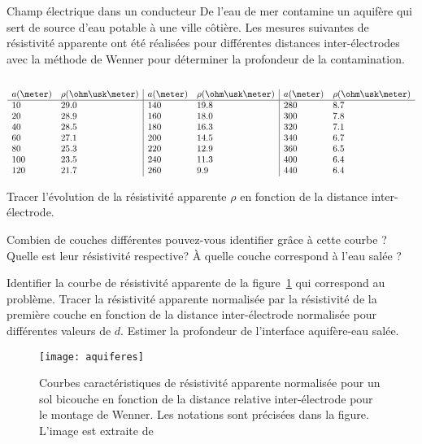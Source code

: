 \begin{td}{Champ électrique dans un conducteur}
	De l'eau de mer contamine un aquifère qui sert de source d'eau potable à 
	une ville côtière. Les mesures suivantes de résistivité apparente ont été
	réalisées pour différentes distances inter-électrodes avec la méthode de 
	Wenner pour déterminer la profondeur de la contamination.
	
	\begin{equation*}
	\begin{array}{l l| l l| l l} \\
		a (\meter) & \rho (\ohm \usk \meter) & a (\meter) & 
		\rho (\ohm \usk \meter) &a(\meter) & \rho (\ohm \usk \meter) \\ \hline
		10	& 29.0	& 140	& 19.8	& 280	& 8.7 \\
		20	& 28.9	& 160	& 18.0	& 300	& 7.8 \\
		40 	& 28.5	& 180	& 16.3	& 320	& 7.1 \\
		60	& 27.1  & 200	& 14.5	& 340	& 6.7 \\
		80	& 25.3	& 220	& 12.9	& 360	& 6.5 \\
		100	& 23.5	& 240	& 11.3	& 400	& 6.4 \\
		120	& 21.7	& 260	& 9.9	& 440	& 6.4 \\
	\end{array}
	\end{equation*}
	
	\begin{exlist}
		\item Tracer l'évolution de la résistivité apparente $\rho$ 
		  en fonction de la distance inter-électrode.
		\item Combien de couches différentes pouvez-vous identifier 
		  grâce à cette courbe ? Quelle est leur résistivité respective? 
		  À quelle couche correspond à l'eau salée ?
	  \item Identifier la courbe de résistivité apparente de la figure~\ref{fig:aquiferes}
	    qui correspond au problème. Tracer la résistivité apparente 
	    normalisée par la résistivité de la première 
	    couche en fonction de la distance inter-électrode normalisée pour 
	    différentes valeurs de $d$.
	    Estimer la profondeur de l'interface 
	    aquifère-eau salée. 	
	    \end{exlist}



\begin{figure}[h!]
	\centering
	\texttt{[image: aquiferes]}
	\caption{Courbes caractéristiques de résistivité apparente normalisée pour un sol
		 bicouche en fonction de la distance relative inter-électrode 
		 pour le montage de Wenner. Les
	 	notations sont précisées dans la figure. L'image est extraite de 
		\cite{Lowrie2007}}%
	\label{fig:aquiferes}
\end{figure}


\end{td}

